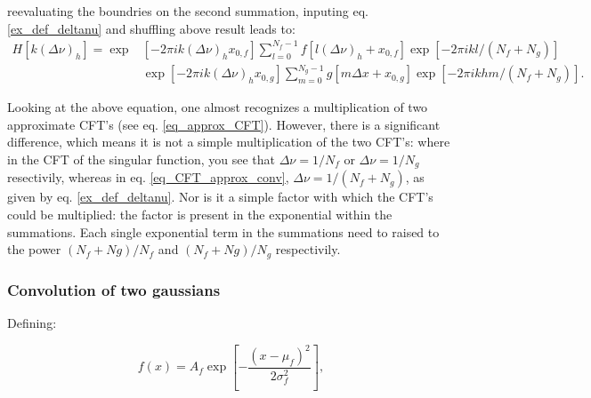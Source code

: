 reevaluating the boundries on the second summation, inputing eq. \eqref{ex_def_deltanu} and shuffling above result leads to:
\begin{equation}\label{eq_CFT_approx_conv}
\begin{aligned}
H[k(\Delta\nu)_h] = \operatorname{exp}&[-2\pi i k(\Delta\nu)_h x_{0,f}] \sum_{l=0}^{N_f-1} f[l(\Delta\nu)_h + x_{0,f}]\operatorname{exp}[-2\pi i k l/(N_f+N_g)] \\
& \operatorname{exp}[-2\pi i k(\Delta\nu)_h x_{0,g}]  \sum_{m=0}^{N_g-1}g[m\Delta x + x_{0,g}] \operatorname{exp}[-2\pi i kh m/(N_f+N_g)].
\end{aligned}
\end{equation}

Looking at the above equation, one almost recognizes a multiplication of two approximate CFT's (see eq. \eqref{eq_approx_CFT}). However, there is a significant difference, which means it is not a simple multiplication of the two CFT's: where in the CFT of the singular function, you see that $\Delta\nu = 1/N_f$ or $\Delta\nu = 1/N_g$ resectivily, whereas in eq. \eqref{eq_CFT_approx_conv}, $\Delta\nu = 1/(N_f + N_g)$, as given by eq. \eqref{ex_def_deltanu}. Nor is it a simple factor with which the CFT's could be multiplied: the factor is present in the exponential within the summations. Each single exponential term in the summations need to raised to the power $(N_f+Ng)/N_f$ and $(N_f+Ng)/N_g$ respectivily.%







\subsubsection{Convolution of two gaussians}
Defining:

\begin{equation}
f(x)=A_{f} \exp{\left[-\frac{\left(x-\mu_{f}\right)^{2}}{2 \sigma_{f}^{2}}\right]},
\end{equation}

